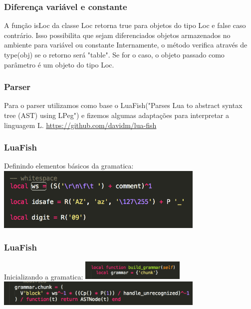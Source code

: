 \documentclass{beamer}
\begin{document}
\begin{frame}
    \frametitle{Diferença variável e constante}
    A função isLoc da classe Loc retorna true para objetos do tipo Loc e false caso contrário. Isso possibilita que sejam diferenciados objetos armazenados no ambiente para variável ou constante
    \newline
    Internamente, o método verifica através de type(obj) se o retorno será "table". Se for o caso, o objeto passado como parâmetro é um objeto do tipo Loc.
    
\end{frame}

\begin{frame}
    \frametitle{Parser}
    Para o parser utilizamos como base o LuaFish("Parses Lua to abstract syntax tree (AST) using LPeg") e fizemos algumas adaptações para interpretar a linguagem L.
    \newline
    \newline
    \newline
    \newline
    \newline
    \url{https://github.com/davidm/lua-fish}
\end{frame}

\begin{frame}
    \frametitle{LuaFish}
    Definindo elementos básicos da gramatica:\newline
    \includegraphics[width=10cm]{images/gramma_example.png}
    
\end{frame}

\begin{frame}
    \frametitle{LuaFish}
    Inicializando a gramatica:\newline
    \includegraphics[width=5cm]{images/init_grammar.png}
    \newline
    \newline
    \includegraphics[width=10cm]{images/chunck.png}
    \newline
    
\end{frame}
\end{document}
